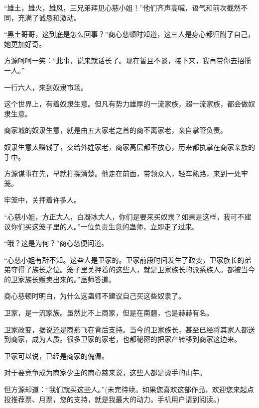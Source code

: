 \begin{this_body}
“雄土，雄火，雄风，三兄弟拜见心慈小姐！”他们齐声高喊，语气和前次截然不同，充满了诚恳和激动。

“黑土哥哥，这到底是怎么回事？”商心慈顿时知道，这三人是身心都归附了自己，她更加好奇。

方源呵呵一笑：“此事，说来就话长了。现在暂且不谈，接下来，我再带你去招揽一人。”

一行六人，来到奴隶市场。

这个世界上，有着奴隶生意。但凡有势力雄厚的一流家族，超一流家族，都会做奴隶生意。

商家城的奴隶生意，就是由五大家老之首的商不离家老，亲自掌管负责。

奴隶生意太赚钱了，交给外姓家老，商家高层都不放心，历来都执掌在商家亲族的手中。

方源谋事在先，早就打探清楚。他走在前面，带领众人，轻车熟路，来到一处牢笼。

牢笼中，关押着许多人。

“心慈小姐，方正大人，白凝冰大人，你们是要来买奴隶？如果是这样，我可不建议你们买这笼子里的人。”一位负责生意的蛊师，立即走了过来。

“哦？这是为何？”商心慈便问道。

“心慈小姐有所不知。这些人是卫家的。卫家前段时间发生了政变，卫家族长的弟弟夺得了族长之位。笼子里关押着的这些人，就是卫家族长的派系族人。都被当今的卫家族长贩卖出来的。”蛊师答道。

商心慈顿时明白，为什么这蛊师不建议自己买这些奴隶了。

卫家，是一流家族。虽然比不上商家，但是在南疆，也是赫赫有名。

卫家政变，据说还是商燕飞在背后支持。当今的卫家族长，甚至已经将其家人都送到商家，成为人质。很多卫家的家老，也都秘密的把家产转移到商家这边来。

卫家可以说，已经是商家的傀儡。

对于要竞争成为商家少主的商心慈来说，这些人都是烫手的山芋。

但方源却道：“我们就买这些人。”(未完待续。如果您喜欢这部作品，欢迎您来起点投推荐票、月票，您的支持，就是我最大的动力。手机用户请到阅读。)

\end{this_body}

